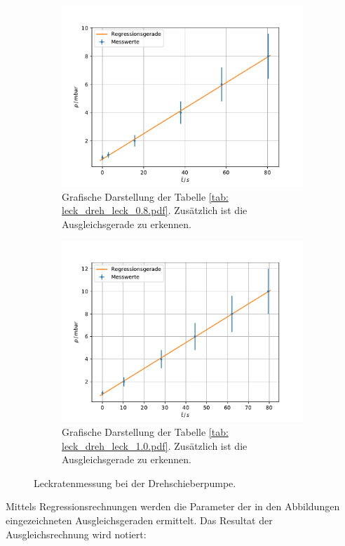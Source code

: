 \begin{figure}
    \centering
    \begin{subfigure}{0.4\textwidth}
        \centering
        \includegraphics[width=1\textwidth]{../Messdaten/plots/dreh/leckrate_dreh_08.pdf}
        \caption{Grafische Darstellung der Tabelle \ref{tab: leck_dreh_leck_0.8.pdf}. Zusätzlich ist die Ausgleichsgerade zu erkennen.}
        \label{fig: drehs_leck_1}
    \end{subfigure}
    \begin{subfigure}{0.4\textwidth}
        \centering
        \includegraphics[width=1\textwidth]{../Messdaten/plots/dreh/leckrate_dreh_10.pdf}
        \caption{Grafische Darstellung der Tabelle \ref{tab: leck_dreh_leck_1.0.pdf}. Zusätzlich ist die Ausgleichsgerade zu erkennen.}
    \end{subfigure}
    \caption{Leckratenmessung bei der Drehschieberpumpe.}
      \label{fig: leck_dreh_2}
\end{figure}
Mittels Regressionsrechnungen werden die Parameter der in den Abbildungen eingezeichneten Ausgleichsgeraden ermittelt.
Das Resultat der Ausgleichsrechnung wird notiert:

